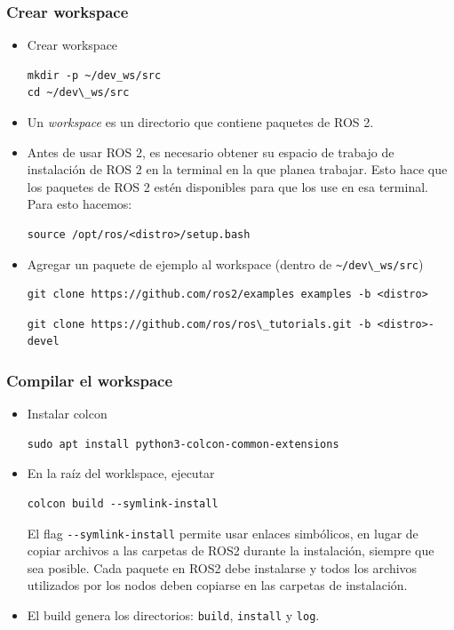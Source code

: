 \begin{frame}[fragile]
    \frametitle{Crear workspace}
    
    \begin{itemize}
        \item Crear workspace
        \begin{lstlisting}[style=bash] 
mkdir -p ~/dev_ws/src
cd ~/dev\_ws/src
        \end{lstlisting}
        
        \item Un \emph{workspace} es un directorio que contiene paquetes de ROS 2.
        \item Antes de usar ROS 2, es necesario obtener su espacio de trabajo de instalación de ROS 2 en la terminal en la que planea trabajar. Esto hace que los paquetes de ROS 2 estén disponibles para que los use en esa terminal. Para esto hacemos:
        
\begin{lstlisting}[style=bash] 
source /opt/ros/<distro>/setup.bash
\end{lstlisting}
        


\item Agregar un paquete de ejemplo al workspace (dentro de \lstinline[style=bash]{~/dev\_ws/src})
\begin{lstlisting}[style=bash] 
git clone https://github.com/ros2/examples examples -b <distro>
\end{lstlisting}

\begin{lstlisting}[style=bash] 
git clone https://github.com/ros/ros\_tutorials.git -b <distro>-devel
\end{lstlisting}
    \end{itemize}
\end{frame}


\begin{frame}[fragile]
	\frametitle{Compilar el workspace}
\begin{itemize}
    \item Instalar colcon
\begin{lstlisting}[style=bash] 
sudo apt install python3-colcon-common-extensions
\end{lstlisting}

    \item En la raíz del worklspace, ejecutar
\begin{lstlisting}[style=bash] 
colcon build --symlink-install
\end{lstlisting}

	El flag \lstinline[style=bash]{--symlink-install} permite usar enlaces simbólicos, en lugar de copiar archivos a las carpetas de ROS2 durante la instalación, siempre que sea posible. Cada paquete en ROS2 debe instalarse y todos los archivos utilizados por los nodos deben copiarse en las carpetas de instalación.
	
	\item El build genera los directorios: \lstinline[style=bash]{build}, \lstinline[style=bash]{install} y \lstinline[style=bash]{log}.
\end{itemize}
\end{frame}

